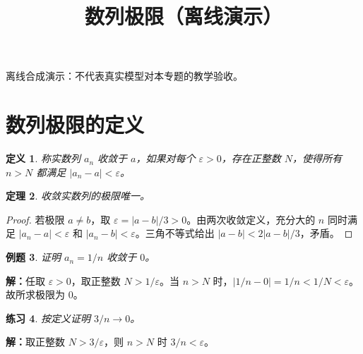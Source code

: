 \documentclass[UTF8,fontset=fandol,11pt]{ctexart}
\title{数列极限（离线演示）}
\date{}
\newtheorem{definition}{定义}[section]
\newtheorem{theorem}[definition]{定理}
\newtheorem{example}[definition]{例题}
\newtheorem{exercise}[definition]{练习}
\begin{document}
\maketitle
\par\noindent 离线合成演示：不代表真实模型对本专题的教学验收。\par
\section{数列极限的定义}
\begin{definition}
称实数列 $a_n$ 收敛于 $a$，如果对每个 $\varepsilon>0$，存在正整数 $N$，使得所有 $n>N$ 都满足 $|a_n-a|<\varepsilon$。
\end{definition}
\begin{theorem}
收敛实数列的极限唯一。
\end{theorem}
\begin{proof}
若极限 $a\ne b$，取 $\varepsilon=|a-b|/3>0$。由两次收敛定义，充分大的 $n$ 同时满足 $|a_n-a|<\varepsilon$ 和 $|a_n-b|<\varepsilon$。三角不等式给出 $|a-b|<2|a-b|/3$，矛盾。
\end{proof}
\begin{example}
证明 $a_n=1/n$ 收敛于 $0$。
\end{example}
\par\noindent\textbf{解：}任取 $\varepsilon>0$，取正整数 $N>1/\varepsilon$。当 $n>N$ 时，$|1/n-0|=1/n<1/N<\varepsilon$。故所求极限为 $0$。\par
\begin{exercise}
按定义证明 $3/n\to0$。
\end{exercise}
\par\noindent\textbf{解：}取正整数 $N>3/\varepsilon$，则 $n>N$ 时 $3/n<\varepsilon$。\par
\end{document}
